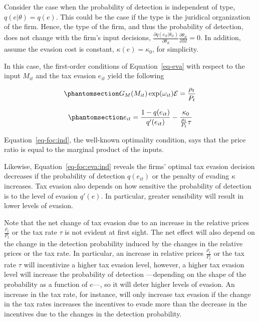 \documentclass[
  12pt]{article}
\begin{document}
Consider the case when the probability of detection is independent of
type, \(q(e|\theta)=q(e)\). This could be the case if the type is the
juridical organization of the firm. Hence, the type of the firm, and
thus the probability of detection, does not change with the firm's input
decisions,
\(\frac{\partial q(e_{it}|\theta_{it})}{\partial \theta_{it}}\frac{\partial \theta_{it}}{\partial M}=0\).
In addition, assume the evasion cost is constant,
\(\kappa(e)=\kappa_0\), for simplicity.

In this case, the first-order conditions of Equation~\ref{eq-eva} with
respect to the input \(M_{it}\) and the tax evasion \(e_{it}\) yield the
following

\begin{equation}\phantomsection\label{eq-foc:ind}{
G_M(M_{it})\exp(\omega_{it})\mathcal{E}=\frac{\rho_{t}}{P_t}
}\end{equation}

\begin{equation}\phantomsection\label{eq-foc:eva:ind}{
e_{it}=\frac{1-q(e_{it})}{q'(e_{it})}-\frac{\kappa_0}{\frac{\rho_{t}}{P_t}\tau}
}\end{equation}

Equation~\ref{eq-foc:ind}, the well-known optimality condition, says
that the price ratio is equal to the marginal product of the inputs.

Likewise, Equation~\ref{eq-foc:eva:ind} reveals the firms' optimal tax
evasion decision decreases if the probability of detection \(q(e_{it})\)
or the penalty of evading \(\kappa\) increases. Tax evasion also depends
on how sensitive the probability of detection is to the level of evasion
\(q'(e)\). In particular, greater sensibility will result in lower
levels of evasion.

Note that the net change of tax evasion due to an increase in the
relative prices \(\frac{\rho_{t}}{P_t}\) or the tax rate \(\tau\) is not
evident at first sight. The net effect will also depend on the change in
the detection probability induced by the changes in the relative prices
or the tax rate. In particular, an increase in relative prices
\(\frac{\rho_{t}}{P_t}\) or the tax rate \(\tau\) will incentivize a
higher tax evasion level, however, a higher tax evasion level will
increase the probability of detection ---depending on the shape of the
probability as a function of \(e\)---, so it will deter higher levels of
evasion. An increase in the tax rate, for instance, will only increase
tax evasion if the change in the tax rates increases the incentives to
evade more than the decrease in the incentives due to the changes in the
detection probability.
\end{document}
